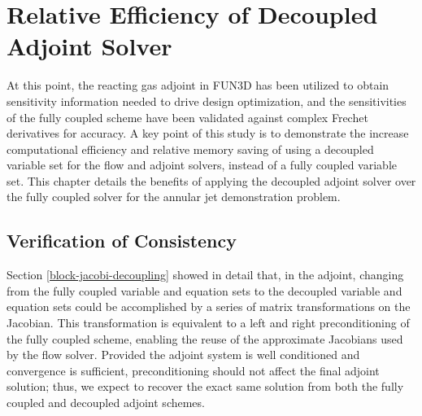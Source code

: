 \chapter{Relative Efficiency of Decoupled Adjoint Solver}
\label{chapter-nine}

At this point, the reacting gas adjoint in FUN3D has been utilized to obtain
sensitivity information needed to drive design optimization, and the
sensitivities of the fully coupled scheme have been validated against complex
Frechet derivatives for accuracy.  A key point of this study is to demonstrate
the increase computational efficiency and relative memory saving of using a
decoupled variable set for the flow and adjoint solvers, instead of a fully
coupled variable set.  This chapter details the benefits of applying the
decoupled adjoint solver over the fully coupled solver for the annular jet
demonstration problem.

\section{Verification of Consistency}
\label{adj-consistency}

Section \ref{block-jacobi-decoupling} showed in detail that, in the adjoint,
changing from the fully coupled variable and equation sets to the decoupled
variable and equation sets could be accomplished by a series of matrix
transformations on the Jacobian.  This transformation is equivalent to a left
and right preconditioning of the fully coupled scheme, enabling the reuse of the
approximate Jacobians used by the flow solver.  Provided the adjoint system is
well conditioned and convergence is sufficient, preconditioning should not
affect the final adjoint solution; thus, we expect to recover the exact same
solution from both the fully coupled and decoupled adjoint schemes.

